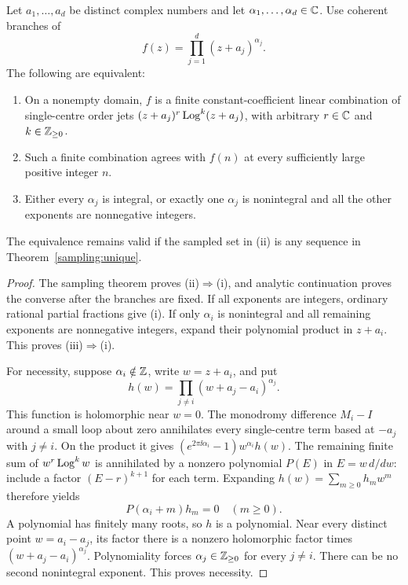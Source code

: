 \begin{theorem}
\label{sampling:centres}
Let $a_1,\ldots,a_d$ be distinct complex numbers and let
$\alpha_1,\ldots,\alpha_d\in\mathbb C$. Use coherent branches of
\[
                       f(z)=\prod_{j=1}^d(z+a_j)^{\alpha_j}.
\]
The following are equivalent:
\begin{enumerate}[label=(\roman*)]
\item On a nonempty domain, $f$ is a finite constant-coefficient
linear combination of single-centre order jets
$(z+a_j)^r\operatorname{Log}^k(z+a_j)$, with arbitrary $r\in\mathbb C$ and
$k\in\mathbb Z_{\ge0}$.
\item Such a finite combination agrees with $f(n)$ at every
sufficiently large positive integer $n$.
\item Either every $\alpha_j$ is integral, or exactly one
$\alpha_j$ is nonintegral and all the other exponents are
nonnegative integers.
\end{enumerate}
The equivalence remains valid if the sampled set in (ii) is any
sequence in Theorem~\ref{sampling:unique}.
\end{theorem}
\begin{proof}
The sampling theorem proves (ii)$\Rightarrow$(i), and analytic
continuation proves the converse after the branches are fixed. If all
exponents are integers, ordinary rational partial fractions give (i).
If only $\alpha_i$ is nonintegral and all remaining exponents are
nonnegative integers, expand their polynomial product in $z+a_i$.
This proves (iii)$\Rightarrow$(i).

For necessity, suppose $\alpha_i\notin\mathbb Z$, write $w=z+a_i$, and put
\[
             h(w)=\prod_{j\ne i}(w+a_j-a_i)^{\alpha_j}.
\]
This function is holomorphic near $w=0$. The monodromy difference
$M_i-I$ around a small loop about zero annihilates every single-centre
term based at $-a_j$ with
$j\ne i$. On the product it gives
$(e^{2\pi\ii\alpha_i}-1)w^{\alpha_i}h(w)$.
The remaining finite sum of $w^r\operatorname{Log}^k w$ is annihilated by a
nonzero polynomial $P(E)$ in $E=w\,d/dw$: include a factor
$(E-r)^{k+1}$ for each term. Expanding $h(w)=\sum_{m\ge0}h_mw^m$
therefore yields
\[
                         P(\alpha_i+m)h_m=0\quad(m\ge0).
\]
A polynomial has finitely many roots, so $h$ is a polynomial.
Near every distinct point $w=a_i-a_j$, its factor there is a
nonzero holomorphic factor times $(w+a_j-a_i)^{\alpha_j}$.
Polynomiality forces $\alpha_j\in\mathbb Z_{\ge0}$ for every $j\ne i$.
There can be no second nonintegral exponent. This proves necessity.
\end{proof}


